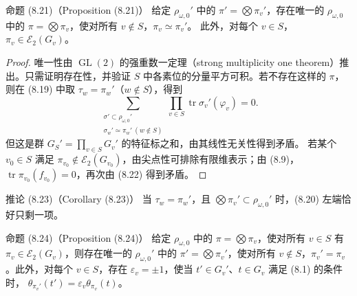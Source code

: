 \begin{originaltheorem}{命题 (8.21)（Proposition (8.21)）}
给定 $\rho_{\omega,0}'$ 中的 $\pi'=\bigotimes\pi_v'$，存在唯一的
$\rho_{\omega,0}$ 中的 $\pi=\bigotimes\pi_v$，使对所有 $v\notin S$，$\pi_v\simeq\pi_v'$。
此外，对每个 $v\in S$，$\pi_v\in\mathcal E_2(G_v)$。
\end{originaltheorem}
\begin{proof}
唯一性由 $\operatorname{GL}(2)$ 的强重数一定理（strong multiplicity one theorem）推出。只需证明存在性，并验证 $S$ 中各素位的分量平方可积。若不存在这样的 $\pi$，则在 (8.19) 中取
$\tau_w=\pi_w'$（$w\notin S$），得到
\begin{equation}
 \sum_{\substack{\sigma'\subset\rho_{\omega,0}'\\\sigma_w'\simeq\pi_w'\ (w\notin S)}}
 \prod_{v\in S}\operatorname{tr}\sigma_v'(\varphi_v)=0.\tag{8.22}
\end{equation}
但这是群 $G_S'=\prod_{v\in S}G_v'$ 的特征标之和，由其线性无关性得到矛盾。
若某个 $v_0\in S$ 满足 $\pi_{v_0}\notin\mathcal E_2(G_{v_0})$，由尖点性可排除有限维表示；由
(8.9)，$\operatorname{tr}\pi_{v_0}(f_{v_0})=0$，再次由 (8.22) 得到矛盾。
\end{proof}

\begin{originaltheorem}{推论 (8.23)（Corollary (8.23)）}
当 $\tau_w=\pi_w'$，且 $\bigotimes\pi_v'\subset\rho_{\omega,0}'$ 时，(8.20) 左端恰好只剩一项。
\end{originaltheorem}

\begin{originaltheorem}{命题 (8.24)（Proposition (8.24)）}
给定 $\rho_{\omega,0}$ 中的 $\pi=\bigotimes\pi_v$，使对所有 $v\in S$ 有
$\pi_v\in\mathcal E_2(G_v)$，则存在唯一的 $\rho_{\omega,0}'$ 中的
$\pi'=\bigotimes\pi_v'$，使对所有 $v\notin S$，$\pi_v'=\pi_v$。此外，对每个 $v\in S$，存在
$\varepsilon_v=\pm1$，使当 $t'\in G_v'$、$t\in G_v$ 满足 (8.1) 的条件时，
$\theta_{\pi_v'}(t')=\varepsilon_v\theta_{\pi_v}(t)$。
\end{originaltheorem}

